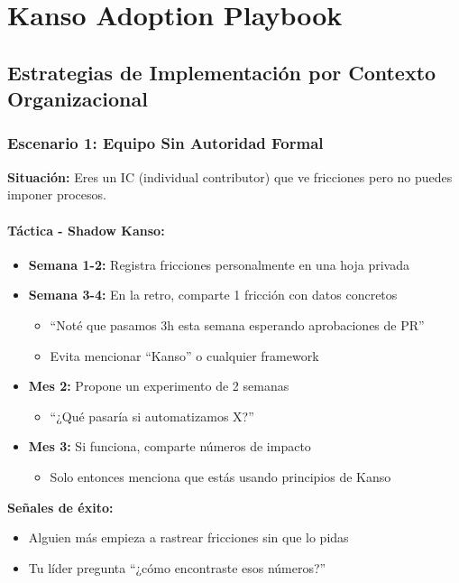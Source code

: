 \section{Kanso Adoption Playbook}
\subsection*{Estrategias de Implementación por Contexto Organizacional}

\subsubsection*{Escenario 1: Equipo Sin Autoridad Formal}

\textbf{Situación:} Eres un IC (individual contributor) que ve fricciones pero no puedes imponer procesos.

\paragraph{Táctica - Shadow Kanso:}

\begin{itemize}
    \item \textbf{Semana 1-2:} Registra fricciones personalmente en una hoja privada
    \item \textbf{Semana 3-4:} En la retro, comparte 1 fricción con datos concretos
    \begin{itemize}
        \item ``Noté que pasamos 3h esta semana esperando aprobaciones de PR''
        \item Evita mencionar ``Kanso'' o cualquier framework
    \end{itemize}
    \item \textbf{Mes 2:} Propone un experimento de 2 semanas
    \begin{itemize}
        \item ``¿Qué pasaría si automatizamos X?''
    \end{itemize}
    \item \textbf{Mes 3:} Si funciona, comparte números de impacto
    \begin{itemize}
        \item Solo entonces menciona que estás usando principios de Kanso
    \end{itemize}
\end{itemize}

\textbf{Señales de éxito:}
\begin{itemize}
    \item Alguien más empieza a rastrear fricciones sin que lo pidas
    \item Tu líder pregunta ``¿cómo encontraste esos números?''
\end{itemize}

